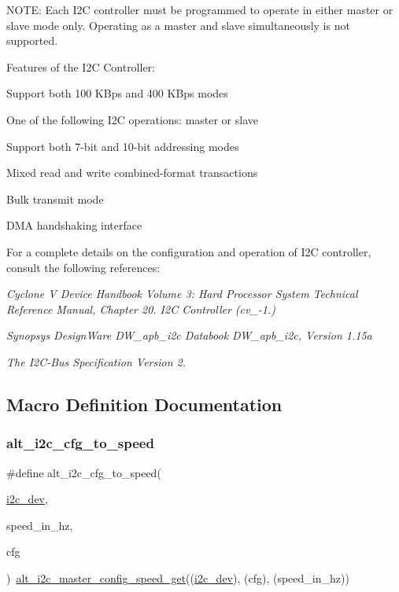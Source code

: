 N\+O\+TE\+: Each I2C controller must be programmed to operate in either master or slave mode only. Operating as a master and slave simultaneously is not supported.

Features of the I2C Controller\+:
\begin{DoxyItemize}
\item Support both 100 K\+Bps and 400 K\+Bps modes
\item One of the following I2C operations\+: master or slave
\item Support both 7-\/bit and 10-\/bit addressing modes
\item Mixed read and write combined-\/format transactions
\item Bulk transmit mode
\item D\+MA handshaking interface
\end{DoxyItemize}

For a complete details on the configuration and operation of I2C controller, consult the following references\+:
\begin{DoxyItemize}
\item {\itshape Cyclone V Device Handbook Volume 3\+: Hard Processor System Technical Reference Manual, Chapter 20. I2C Controller (cv\+\_-\/1.)}
\item {\itshape Synopsys Design\+Ware D\+W\+\_\+apb\+\_\+i2c Databook D\+W\+\_\+apb\+\_\+i2c, Version 1.\+15a}
\item {\itshape The I2\+C-\/\+Bus Specification Version 2.} 
\end{DoxyItemize}

\subsection{Macro Definition Documentation}
\mbox{\label{group__ALT__I2C_gac5671984a2084fced59a4c2b55a80171}} 
\subsubsection{\texorpdfstring{alt\_i2c\_cfg\_to\_speed}{alt\_i2c\_cfg\_to\_speed}}
{\footnotesize\ttfamily \#define alt\+\_\+i2c\+\_\+cfg\+\_\+to\+\_\+speed(\begin{DoxyParamCaption}\item[{}]{\mbox{\hyperlink{structi2c__dev}{i2c\+\_\+dev}},  }\item[{}]{speed\+\_\+in\+\_\+hz,  }\item[{}]{cfg }\end{DoxyParamCaption})~\mbox{\hyperlink{group__ALT__I2C_ga90d8a89d7b447bede11a9c1c79ea3b99}{alt\+\_\+i2c\+\_\+master\+\_\+config\+\_\+speed\+\_\+get}}((\mbox{\hyperlink{structi2c__dev}{i2c\+\_\+dev}}), (cfg), (speed\+\_\+in\+\_\+hz))}


